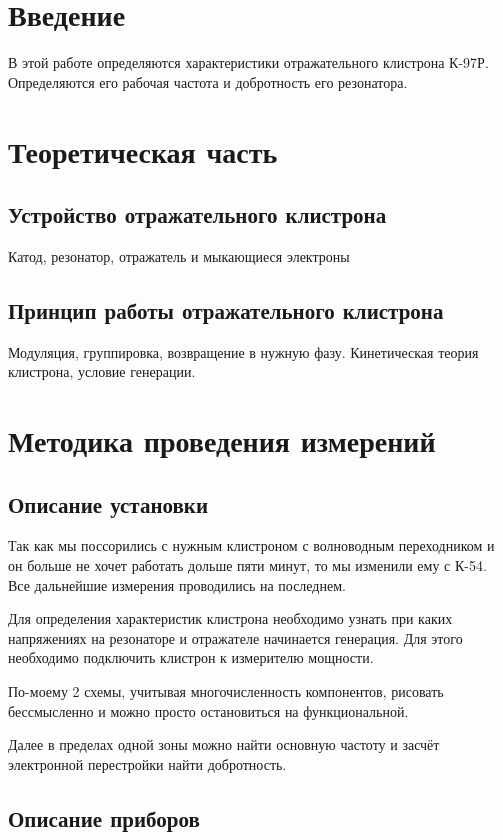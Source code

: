 \documentclass[a4paper]{article}
\begin{document}
	\section*{Введение}
	В этой работе определяются характеристики отражательного клистрона К-97Р. Определяются его рабочая частота и добротность его резонатора.
	
	\section{Теоретическая часть}
	\subsection{Устройство отражательного клистрона}
	Катод, резонатор, отражатель и мыкающиеся электроны
	\subsection{Принцип работы отражательного клистрона}
	Модуляция, группировка, возвращение в нужную фазу. Кинетическая теория клистрона, условие генерации.
	
	\section{Методика проведения измерений}
	\subsection{Описание установки}
	Так как мы поссорились с нужным клистроном с волноводным переходником и он больше не хочет работать дольше пяти минут, то мы изменили ему с К-54. Все дальнейшие измерения проводились на последнем.

	Для определения характеристик клистрона необходимо узнать при каких напряжениях на резонаторе и отражателе начинается генерация. Для этого необходимо подключить клистрон к измерителю мощности.

	По-моему 2 схемы, учитывая многочисленность компонентов, рисовать бессмысленно и можно просто остановиться на функциональной.

	Далее в пределах одной зоны можно найти основную частоту и засчёт электронной перестройки найти добротность.
	
	\subsection{Описание приборов}
\end{document}
